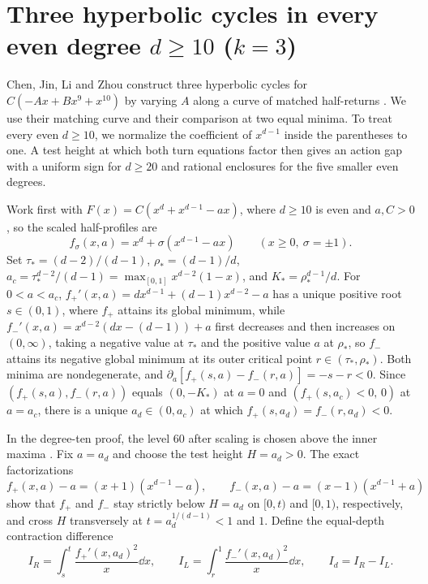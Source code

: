 \section{Three hyperbolic cycles in every even degree \texorpdfstring{$d\ge 10$ ($k=3$)}{d >= 10 (k = 3)}}\label{sec:trinomials}

Chen, Jin, Li and Zhou construct three hyperbolic cycles for
$C(-Ax+Bx^9+x^{10})$ by varying $A$ along a curve of matched
half-returns \cite[\S3, Lemmas~3.1--3.2 and Theorem~1.2]{CJLZ}.
We use their matching curve and their comparison at two equal minima.
To treat every even $d\ge10$, we normalize the coefficient of $x^{d-1}$
inside the parentheses to one. A test height at which both turn
equations factor then gives an action gap with a uniform sign for
$d\ge20$ and rational enclosures for the five smaller even degrees.

Work first with $F(x)=C(x^d+x^{d-1}-ax)$, where $d\ge 10$ is even and $a,C>0$, so the scaled half-profiles are
\begin{equation}\label{eq:trinomial-profiles}
  f_\sigma(x,a) = x^d + \sigma(x^{d-1} - ax) \qquad (x\ge 0,\ \sigma=\pm 1).
\end{equation}
Set $\tau_*=(d-2)/(d-1)$, $\rho_*=(d-1)/d$, $a_c=\tau_*^{d-2}/(d-1)=\max_{[0,1]}x^{d-2}(1-x)$, and
$K_*=\rho_*^{d-1}/d$. For $0<a<a_c$, $f_+'(x,a)=dx^{d-1}+(d-1)x^{d-2}-a$ has a unique positive root
$s\in(0,1)$, where $f_+$ attains its global minimum, while $f_-'(x,a)=x^{d-2}(dx-(d-1))+a$ first
decreases and then increases on $(0,\infty)$, taking a negative value at $\tau_*$ and the positive
value $a$ at $\rho_*$, so $f_-$ attains its negative global minimum at its outer critical point
$r\in(\tau_*,\rho_*)$. Both minima are nondegenerate, and $\partial_a[f_+(s,a)-f_-(r,a)]=-s-r<0$.
Since $(f_+(s,a),f_-(r,a))$ equals $(0,-K_*)$ at $a=0$ and $(f_+(s,a_c)<0,\,0)$ at $a=a_c$, there is a
unique $a_d\in(0,a_c)$ at which $f_+(s,a_d)=f_-(r,a_d)<0$.

In the degree-ten proof, the level $60$ after scaling is chosen above
the inner maxima \cite[Lemma~3.2, (3.14)--(3.19)]{CJLZ}.
Fix $a=a_d$ and choose the test height $H=a_d>0$. The exact factorizations
\begin{equation}\label{eq:trinomial-fact}
  f_+(x,a) - a = (x+1)(x^{d-1}-a), \qquad f_-(x,a) - a = (x-1)(x^{d-1}+a)
\end{equation}
show that $f_+$ and $f_-$ stay strictly below $H=a_d$ on $[0,t)$ and $[0,1)$, respectively, and cross
$H$ transversely at $t=a_d^{1/(d-1)}<1$ and $1$. Define the equal-depth contraction difference
\begin{equation}\label{eq:Id-def}
  I_R = \int_s^t \frac{f_+'(x,a_d)^2}{x}\dd x, \qquad I_L = \int_r^1 \frac{f_-'(x,a_d)^2}{x}\dd x, \qquad I_d = I_R - I_L.
\end{equation}

